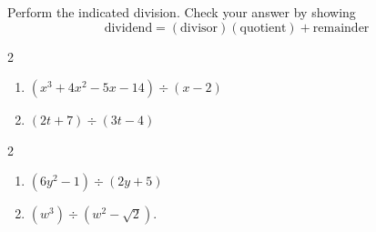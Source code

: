 \begin{example}\label{polynomiallongdivex}  Perform the indicated division.  Check your answer by showing \[\text{dividend} = (\text{divisor})( \text{quotient}) + \text{remainder}\]


\begin{multicols}{2}

\begin{enumerate}

\item  $\left(x^3 + 4x^2 - 5x - 14\right) \div (x-2)$

\item  $\left(2t +  7\right) \div \left(3t - 4\right)$

\setcounter{HW}{\value{enumi}}

\end{enumerate}

\end{multicols}

\begin{multicols}{2}

\begin{enumerate}

\setcounter{enumi}{\value{HW}}



\item  $\left(6y^2 - 1 \right) \div \left(2y + 5\right)$

\item  $\left(w^3 \right) \div \left(w^2 - \sqrt{2}\right)$.

\setcounter{HW}{\value{enumi}}

\end{enumerate}

\end{multicols}


\end{example}

